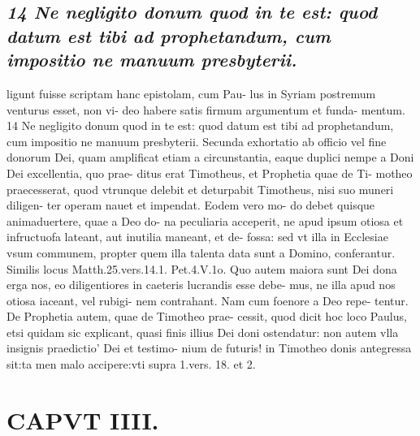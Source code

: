 \documentclass{article}
\begin{document}
\begin{pages}
\subsection*{\textit{14 Ne negligito donum quod in te est: quod datum est tibi ad prophetandum, cum impositio ne manuum presbyterii.}}ligunt fuisse scriptam hanc epistolam, cum Pau- lus in Syriam postremum venturus esset, non vi- deo habere satis firmum argumentum et funda- mentum. 14 Ne negligito donum quod in te est: quod datum est tibi ad prophetandum, cum impositio ne manuum presbyterii. Secunda exhortatio ab officio vel fine donorum Dei, quam amplificat etiam a circunstantia, eaque duplici nempe a Doni Dei excellentia, quo prae- ditus erat Timotheus, et Prophetia quae de Ti- motheo praecesserat, quod vtrunque delebit et deturpabit Timotheus, nisi suo muneri diligen- ter operam nauet et impendat. Eodem vero mo- do debet quisque animaduertere, quae a Deo do- na peculiaria acceperit, ne apud ipsum otiosa et infructuofa lateant, aut inutilia maneant, et de- fossa: sed vt illa in Ecclesiae vsum communem, propter quem illa talenta data sunt a Domino, conferantur. Similis locus Matth.25.vers.14.1. Pet.4.V.1o. Quo autem maiora sunt Dei dona erga nos, eo diligentiores in caeteris lucrandis esse debe- mus, ne illa apud nos otiosa iaceant, vel rubigi- nem contrahant. Nam cum foenore a Deo repe- tentur. De Prophetia autem, quae de Timotheo prae- cessit, quod dicit hoc loco Paulus, etsi quidam sic explicant, quasi finis illius Dei doni ostendatur: non autem vlla insignis praedictio' Dei et testimo- nium de futuris! in Timotheo donis antegressa sit:ta men malo accipere:vti supra 1.vers. 18. et 2.  \pend
\section*{CAPVT  IIII. }
\marginpar{[ p.235 ]}\pstart {}
{}

\end{pages}
\end{document}
